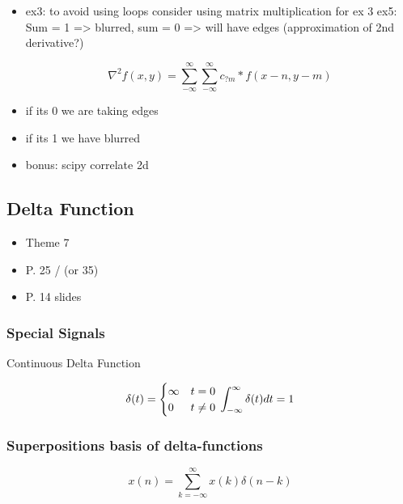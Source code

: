 \documentclass[
]{article}
\author{}
\date{}
\providecommand{\tightlist}{%
  \setlength{\itemsep}{0pt}\setlength{\parskip}{0pt}}
\begin{document}
\begin{itemize}
\item
  ex3: to avoid using loops consider using matrix multiplication for ex
  3 ex5: Sum = 1 =\textgreater{} blurred, sum = 0 =\textgreater{} will
  have edges (approximation of 2nd derivative?)

  \[ \nabla^2{f(x,y) = \sum_{-\infty}^{\infty}{ \sum_{-\infty}^{\infty}{c_{?m}*f(x-n, y-m) }}} \]
\item
  if its 0 we are taking edges
\item
  if its 1 we have blurred
\item
  bonus: scipy correlate 2d
\end{itemize}

\hypertarget{delta-function}{%
\subsection{Delta Function}\label{delta-function}}

\begin{itemize}
\tightlist
\item
  Theme 7
\item
  P. 25 / (or 35)
\item
  P. 14 slides
\end{itemize}

\hypertarget{special-signals}{%
\subsubsection{Special Signals}\label{special-signals}}

Continuous Delta Function

\begin{equation*}
    \delta(t) = \begin{cases}
        \infty & t = 0 \\
        0 & t \neq 0
    \end{cases}
    \\ \int_{-\infty}^{\infty}{\delta(t)dt} = 1
\end{equation*}

\hypertarget{superpositions-basis-of-delta-functions}{%
\subsubsection{Superpositions basis of
delta-functions}\label{superpositions-basis-of-delta-functions}}

\[
    x(n) = \sum_{k=-\infty}^{\infty}{x(k)\delta(n-k)}
\]
\end{document}

